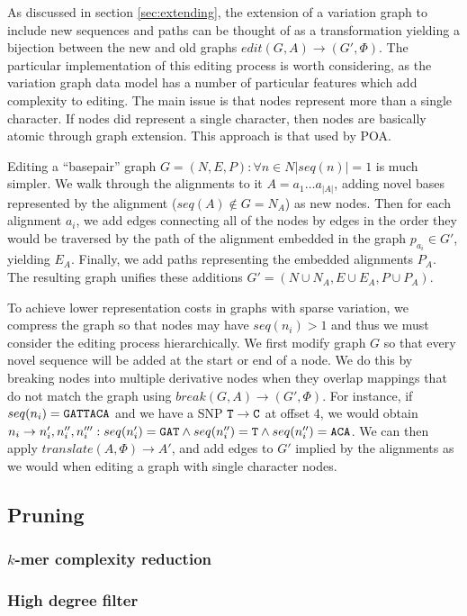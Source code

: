 As discussed in section \ref{sec:extending}, the extension of a variation graph to include new sequences and paths can be thought of as a transformation yielding a bijection between the new and old graphs $edit(G, A) \to (G', \Phi)$.
The particular implementation of this editing process is worth considering, as the variation graph data model has a number of particular features which add complexity to editing.
The main issue is that nodes represent more than a single character.
If nodes did represent a single character, then nodes are basically atomic through graph extension.
This approach is that used by POA.

Editing a ``basepair'' graph $G = (N, E, P) : \forall n \in N |seq(n)| = 1$ is much simpler.
We walk through the alignments to it $A = a_1\ldots a_{|A|}$, adding novel bases represented by the alignment ($seq(A) \notin G = N_A$) as new nodes.
Then for each alignment $a_i$, we add edges connecting all of the nodes by edges in the order they would be traversed by the path of the alignment embedded in the graph $p_{a_i} \in G'$, yielding $E_A$.
Finally, we add paths representing the embedded alignments $P_A$.
The resulting graph unifies these additions $G' = (N \cup N_A, E \cup E_A, P \cup P_A)$.

To achieve lower representation costs in graphs with sparse variation, we compress the graph so that nodes may have $seq(n_i) > 1$ and thus we must consider the editing process hierarchically.
We first modify graph $G$ so that every novel sequence will be added at the start or end of a node.
We do this by breaking nodes into multiple derivative nodes when they overlap mappings that do not match the graph using $break(G, A) \to (G', \Phi)$.
For instance, if $seq(n_i) = {\tt GATTACA}$ and we have a SNP ${\tt T} \to {\tt C}$ at offset 4, we would obtain $n_i \to n_i', n_i'', n_i''' : seq(n_i') = {\tt GAT} \land seq(n_i'') = {\tt T} \land seq(n_i'') = {\tt ACA}$.
We can then apply $translate(A, \Phi) \to A'$, and add edges to $G'$ implied by the alignments as we would when editing a graph with single character nodes.

\subsection{Pruning}
\subsubsection{$k$-mer complexity reduction}
\subsubsection{High degree filter}

